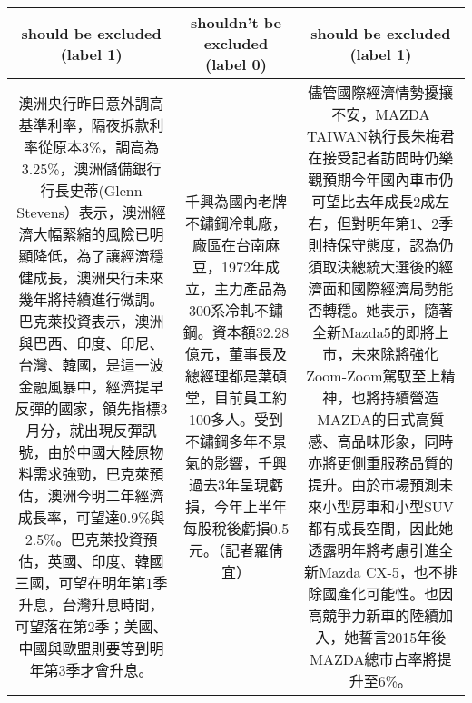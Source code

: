 {
\def\sym#1{\ifmmode^{#1}\else\(^{#1}\)\fi}
\begin{tabularx}{\textwidth}{c c c}
\hline

\textbf{should be excluded (label 1)} & 
\textbf{shouldn't be excluded (label 0)} & 
\textbf{should be excluded (label 1)}\\
\hline
澳洲央行昨日意外調高基準利率，隔夜拆款利率從原本3\%，調高為3.25\%，澳洲儲備銀行行長史蒂(Glenn Stevens）表示，澳洲經濟大幅緊縮的風險已明顯降低，為了讓經濟穩健成長，澳洲央行未來幾年將持續進行微調。巴克萊投資表示，澳洲與巴西、印度、印尼、台灣、韓國，是這一波金融風暴中，經濟提早反彈的國家，領先指標3月分，就出現反彈訊號，由於中國大陸原物料需求強勁，巴克萊預估，澳洲今明二年經濟成長率，可望達0.9\%與2.5\%。巴克萊投資預估，英國、印度、韓國三國，可望在明年第1季升息，台灣升息時間，可望落在第2季；美國、中國與歐盟則要等到明年第3季才會升息。
&
千興為國內老牌不鏽鋼冷軋廠，廠區在台南麻豆，1972年成立，主力產品為300系冷軋不鏽鋼。資本額32.28億元，董事長及總經理都是葉碩堂，目前員工約100多人。受到不鏽鋼多年不景氣的影響，千興過去3年呈現虧損，今年上半年每股稅後虧損0.5元。（記者羅倩宜）
&
儘管國際經濟情勢擾攘不安，MAZDA TAIWAN執行長朱梅君在接受記者訪問時仍樂觀預期今年國內車市仍可望比去年成長2成左右，但對明年第1、2季則持保守態度，認為仍須取決總統大選後的經濟面和國際經濟局勢能否轉穩。她表示，隨著全新Mazda5的即將上市，未來除將強化Zoom-Zoom駕馭至上精神，也將持續營造MAZDA的日式高質感、高品味形象，同時亦將更側重服務品質的提升。由於市場預測未來小型房車和小型SUV都有成長空間，因此她透露明年將考慮引進全新Mazda CX-5，也不排除國產化可能性。也因高競爭力新車的陸續加入，她誓言2015年後MAZDA總市占率將提升至6\%。
\\
\hline


\end{tabularx}}
